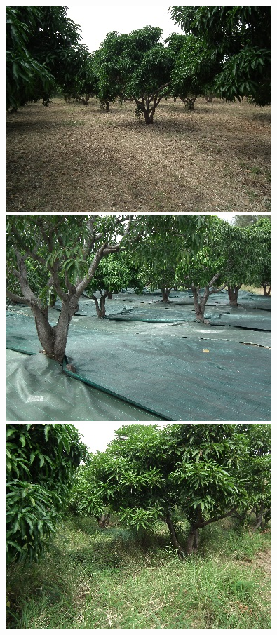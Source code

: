 \begin{figure}[ht]
 \centering
 \includegraphics{photos/er.jpg}
 \includegraphics{photos/ps.jpg}
 \includegraphics{photos/eh.jpg}
 
 \vspace*{0.5cm}
 

\end{figure}
